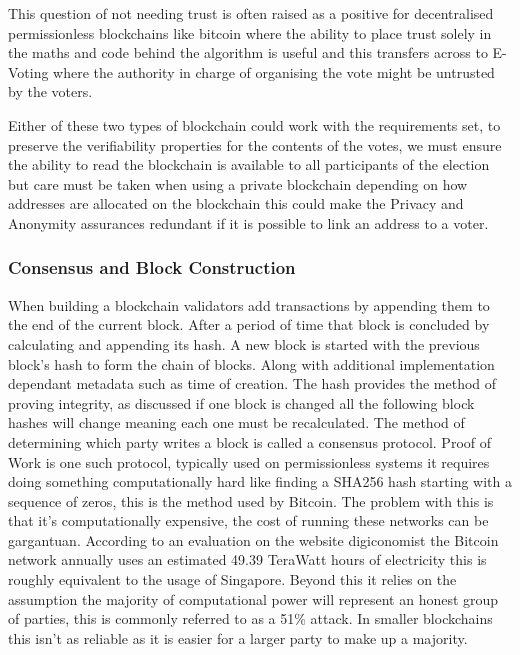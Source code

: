 \documentclass{entcs}
\begin{document}
This question of not needing trust \cite{lemieux2016trusting} is often raised as a positive for decentralised permissionless blockchains like bitcoin where the ability to place trust solely in the maths and code behind the algorithm is useful and this transfers across to E-Voting where the authority in charge of organising the vote might be untrusted by the voters.

Either of these two types of blockchain could work with the requirements set, to preserve the verifiability properties for the contents of the votes, we must ensure the ability to read the blockchain is available to all participants of the election but care must be taken when using a private blockchain depending on how addresses are allocated on the blockchain this could make the Privacy and Anonymity assurances redundant if it is possible to link an address to a voter.

\subsubsection{Consensus and Block Construction} \label{sec: consensus}

When building a blockchain validators add transactions by appending them to the end of the current block. After a period of time that block is concluded by calculating and appending its hash. A new block is started with the previous block's hash to form the chain of blocks. Along with additional implementation dependant metadata such as time of creation. The hash provides the method of proving integrity, as discussed if one block is changed all the following block hashes will change meaning each one must be recalculated. The method of determining which party writes a block is called a consensus protocol. 
Proof of Work\cite{BTCWhitepaper} is one such protocol, typically used on permissionless systems it requires doing something computationally hard like finding a SHA256 hash starting with a sequence of zeros, this is the method used by Bitcoin. The problem with this is that it's computationally expensive, the cost of running these networks can be gargantuan. According to an evaluation on the website digiconomist \cite{BTCenergy} the Bitcoin network annually uses an estimated 49.39 TeraWatt hours of electricity this is roughly equivalent to the usage of Singapore. Beyond this it relies on the assumption the majority of computational power will represent an honest group of parties, this is commonly referred to as a 51\% attack\cite{BTCWhitepaper}\cite{baliga2017understanding}. In smaller blockchains this isn't as reliable as it is easier for a larger party to make up a majority. 
\end{document}
